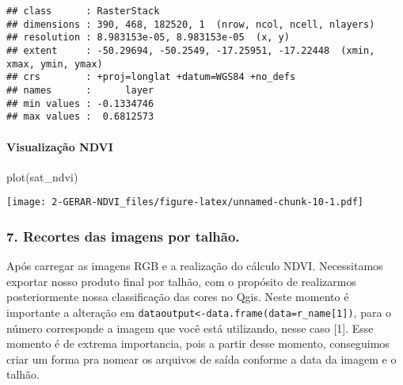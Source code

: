 \documentclass[
]{article}
\newenvironment{Shaded}{\begin{snugshade}}{\end{snugshade}}
\newcommand{\AttributeTok}[1]{\textcolor[rgb]{0.77,0.63,0.00}{#1}}
\newcommand{\DecValTok}[1]{\textcolor[rgb]{0.00,0.00,0.81}{#1}}
\newcommand{\DocumentationTok}[1]{\textcolor[rgb]{0.56,0.35,0.01}{\textbf{\textit{#1}}}}
\newcommand{\FunctionTok}[1]{\textcolor[rgb]{0.00,0.00,0.00}{#1}}
\newcommand{\NormalTok}[1]{#1}
\newcommand{\OtherTok}[1]{\textcolor[rgb]{0.56,0.35,0.01}{#1}}
\newcommand{\SpecialCharTok}[1]{\textcolor[rgb]{0.00,0.00,0.00}{#1}}
\begin{document}
\begin{verbatim}
## class      : RasterStack 
## dimensions : 390, 468, 182520, 1  (nrow, ncol, ncell, nlayers)
## resolution : 8.983153e-05, 8.983153e-05  (x, y)
## extent     : -50.29694, -50.2549, -17.25951, -17.22448  (xmin, xmax, ymin, ymax)
## crs        : +proj=longlat +datum=WGS84 +no_defs 
## names      :      layer 
## min values : -0.1334746 
## max values :  0.6812573
\end{verbatim}

\hypertarget{visualizauxe7uxe3o-ndvi}{%
\paragraph{Visualização NDVI}\label{visualizauxe7uxe3o-ndvi}}

\begin{Shaded}
\begin{Highlighting}[]
\FunctionTok{plot}\NormalTok{(sat\_ndvi)}
\end{Highlighting}
\end{Shaded}

\texttt{[image: 2-GERAR-NDVI\_files/figure-latex/unnamed-chunk-10-1.pdf]}

\hypertarget{recortes-das-imagens-por-talhuxe3o.}{%
\subsubsection{7. Recortes das imagens por
talhão.}\label{recortes-das-imagens-por-talhuxe3o.}}

Após carregar as imagens RGB e a realização do cálculo NDVI.
Necessitamos exportar nosso produto final por talhão, com o propósito de
realizarmos posteriormente nossa classificação das cores no Qgis. Neste
momento é importante a alteração em
\texttt{dataoutput\textless{}-data.frame(data=r\_name{[}1{]})}, para o
número corresponde a imagem que você está utilizando, nesse caso
{[}1{]}. Esse momento é de extrema importancia, pois a partir desse
momento, conseguimos criar um forma pra nomear os arquivos de saída
conforme a data da imagem e o talhão.

\begin{Shaded}
\end{Shaded}
\end{document}
